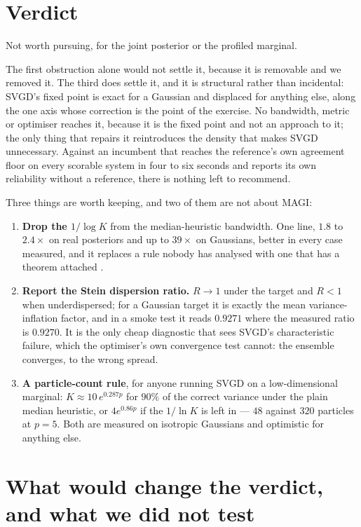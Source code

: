 \documentclass[11pt]{article}
\theoremstyle{remark}
\begin{document}
\section{Verdict}

Not worth pursuing, for the joint posterior or the profiled marginal.

The first obstruction alone would not settle it, because it is removable and we removed it. The
third does settle it, and it is structural rather than incidental: SVGD's fixed point is exact for
a Gaussian and displaced for anything else, along the one axis whose correction is the point of the
exercise. No bandwidth, metric or optimiser reaches it, because it is the fixed point and not an
approach to it; the only thing that repairs it reintroduces the density that makes SVGD
unnecessary. Against an incumbent that reaches the reference's own agreement floor on every
scorable system in four to six seconds and reports its own reliability without a reference, there
is nothing left to recommend.

Three things are worth keeping, and two of them are not about MAGI:
\begin{enumerate}[leftmargin=1.5em,itemsep=2pt]
\item \textbf{Drop the $1/\log K$} from the median-heuristic bandwidth. One line, $1.8$ to
  $2.4\times$ on real posteriors and up to $39\times$ on Gaussians, better in every case measured,
  and it replaces a rule nobody has analysed with one that has a theorem attached \cite{ba2022}.
\item \textbf{Report the Stein dispersion ratio.} $R \to 1$ under the target and $R < 1$ when
  underdispersed; for a Gaussian target it is exactly the mean variance-inflation factor, and in a
  smoke test it reads $0.9271$ where the measured ratio is $0.9270$. It is the only cheap
  diagnostic that sees SVGD's characteristic failure, which the optimiser's own convergence test
  cannot: the ensemble converges, to the wrong spread.
\item \textbf{A particle-count rule}, for anyone running SVGD on a low-dimensional marginal:
  $K \approx 10\,e^{0.287p}$ for $90\%$ of the correct variance under the plain median heuristic,
  or $4e^{0.86p}$ if the $1/\ln K$ is left in --- $48$ against $320$ particles at $p = 5$. Both
  are measured on isotropic Gaussians and optimistic for anything else.
\end{enumerate}

\section{What would change the verdict, and what we did not test}
\end{document}
